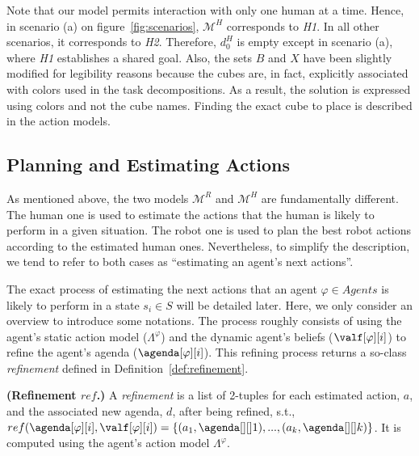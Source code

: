 Note that our model permits interaction with only one human at a time. Hence, in scenario (a) on figure~\ref{fig:scenarios}, $\mathcal{M}^H$ corresponds to \textit{H1}. In all other scenarios, it corresponds to \textit{H2}.
Therefore, $d^H_0$ is empty except in scenario (a), where \textit{H1} establishes a shared goal. Also, the sets $B$ and $X$ have been slightly modified for legibility reasons because the cubes are, in fact, explicitly associated with colors used in the task decompositions. As a result, the solution is expressed using colors and not the cube names. Finding the exact cube to place is described in the action models.

\subsection*{Planning and Estimating Actions}

As mentioned above, the two models $\mathcal{M}^R$ and $\mathcal{M}^H$ are fundamentally different. The human one is used to estimate the actions that the human is likely to perform in a given situation. The robot one is used to plan the best robot actions according to the estimated human ones. Nevertheless, to simplify the description, we tend to refer to both cases as ``estimating an agent's next actions''.

The exact process of estimating the next actions that an agent $\varphi \in Agents$ is likely to perform in a state $s_i \in S$ will be detailed later. Here, we only consider an overview to introduce some notations. 
The process roughly consists of using the agent's static action model ($\Lambda^{\varphi}$) 
and the dynamic agent's beliefs ($\valf[\varphi][i]$)
to refine the agent's agenda ($\agenda[\varphi][i]$). This refining process returns a so-class \textit{refinement} defined in Definition~\ref{def:refinement}.

\begin{definition}
    \textbf{(Refinement $ref$.)} A \emph{refinement} is a list of 2-tuples for each estimated action, $a$, and the associated new agenda, $d$, after being refined, s.t., $ref(\agenda[\varphi][i], \valf[\varphi][i]) = \{ (a_1,\agenda[][]1), ..., (a_k,\agenda[][]k) \}$. It is computed using the agent's action model $\Lambda^{\varphi}$.
    \label{def:refinement}
\end{definition}


